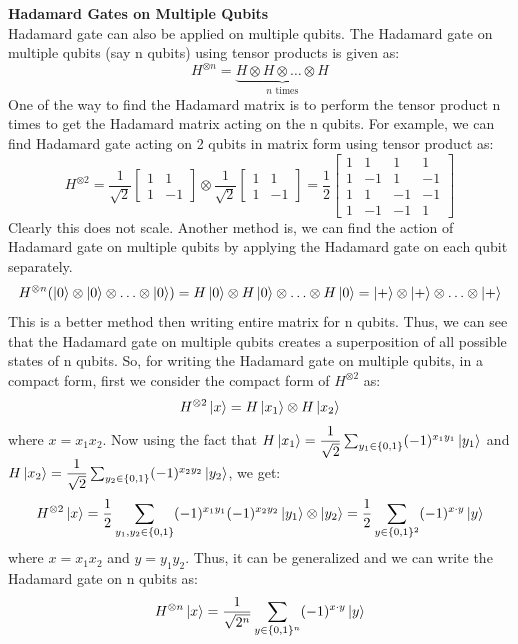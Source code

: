 \textbf{Hadamard Gates on Multiple Qubits}\\
Hadamard gate can also be applied on multiple qubits. The Hadamard gate on multiple qubits (say n qubits) using tensor products is given as:
\[
    H^{\otimes n}=\underbrace{H\otimes H\otimes \ldots \otimes H}_{n \text{ times}}
\]
One of the way to find the Hadamard matrix is to perform the tensor product n times to get the Hadamard matrix acting on the n qubits. For example, we can find Hadamard gate acting on 2 qubits in matrix form using tensor product as:
\[
    H^{\otimes 2}=\dfrac{1}{\sqrt{2}}\begin{bmatrix}
        1 & 1 \\
        1 & -1
    \end{bmatrix}\otimes \dfrac{1}{\sqrt{2}}\begin{bmatrix}
        1 & 1 \\
        1 & -1
    \end{bmatrix}=\dfrac{1}{2}\begin{bmatrix}
        1 & 1 & 1 & 1 \\
        1 & -1 & 1 & -1 \\
        1 & 1 & -1 & -1 \\
        1 & -1 & -1 & 1
    \end{bmatrix}
\]
Clearly this does not scale.
Another method is, we can find the action of Hadamard gate on multiple qubits by applying the Hadamard gate on each qubit separately.
\[
    H^{\otimes n}(\ket{0}\otimes \ket{0}\otimes \ldots \otimes \ket{0})=H\ket{0}\otimes H\ket{0}\otimes \ldots \otimes H\ket{0}=\ket{+}\otimes \ket{+}\otimes \ldots \otimes \ket{+}
\]
This is a better method then writing entire matrix for n qubits. Thus, we can see that the Hadamard gate on multiple qubits creates a superposition of all possible states of n qubits.
So, for writing the Hadamard gate on multiple qubits, in a compact form, first we consider the compact form of $H^{\otimes 2}$ as:
\[
H^{\otimes 2}\ket{x}=H\ket{x_1}\otimes H\ket{x_2}
\] 
where $x=x_1x_2$. Now using the fact that $H\ket{x_1}=\dfrac{1}{\sqrt{2}}\sum_{y_1 \in \{0,1\}} (-1)^{x_1y_1}\ket{y_1}$ and $H\ket{x_2}=\dfrac{1}{\sqrt{2}}\sum_{y_2 \in \{0,1\}} (-1)^{x_2y_2}\ket{y_2}$, we get:
\[ 
H^{\otimes 2}\ket{x}=\dfrac{1}{2}\sum_{y_1,y_2 \in \{0,1\}} (-1)^{x_1y_1}(-1)^{x_2y_2}\ket{y_1}\otimes \ket{y_2}=\dfrac{1}{2}\sum_{y \in \{0,1\}^2}(-1)^{x\cdot y}\ket{y}
\]
where $x=x_1x_2$ and $y=y_1y_2$. Thus, it can be generalized and we can write the Hadamard gate on n qubits as:
\[
H^{\otimes n}\ket{x}=\dfrac{1}{\sqrt{2^n}}\sum_{y \in \{0,1\}^n}(-1)^{x\cdot y}\ket{y}
\]
